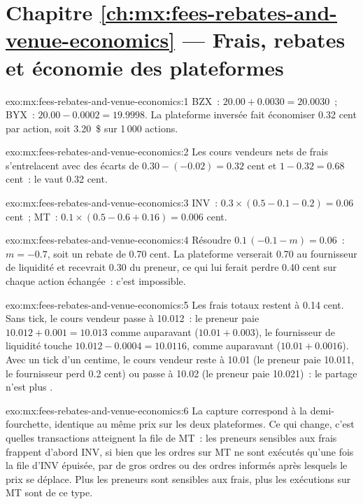 \section*{Chapitre \ref{ch:mx:fees-rebates-and-venue-economics} --- Frais, rebates et économie des plateformes}

\begin{solution}{exo:mx:fees-rebates-and-venue-economics:1}
BZX~: $20.00+0.0030=20.0030$~; BYX~: $20.00-0.0002=19.9998$. La plateforme inversée fait économiser 0.32 cent par action, soit 3.20~\$ sur 1\,000 actions.
\end{solution}

\begin{solution}{exo:mx:fees-rebates-and-venue-economics:2}
Les cours vendeurs nets de frais s'entrelacent avec des écarts de $0.30-(-0.02)=0.32$ cent et $1-0.32=0.68$ cent~: le  vaut 0.32 cent.
\end{solution}

\begin{solution}{exo:mx:fees-rebates-and-venue-economics:3}
INV~: $0.3\times(0.5-0.1-0.2)=0.06$ cent~; MT~: $0.1\times(0.5-0.6+0.16)=0.006$ cent.
\end{solution}

\begin{solution}{exo:mx:fees-rebates-and-venue-economics:4}
Résoudre $0.1\,(-0.1-m)=0.06$~: $m=-0.7$, soit un rebate de 0.70 cent. La plateforme verserait 0.70 au fournisseur de liquidité et recevrait 0.30 du preneur, ce qui lui ferait perdre 0.40 cent sur
chaque action échangée~: c'est impossible.
\end{solution}

\begin{solution}{exo:mx:fees-rebates-and-venue-economics:5}
Les frais totaux restent à 0.14 cent. Sans tick, le cours vendeur passe à 10.012~: le preneur paie $10.012+0.001=10.013$ comme auparavant ($10.01+0.003$), le fournisseur de liquidité touche
$10.012-0.0004=10.0116$, comme auparavant ($10.01+0.0016$). Avec un tick d'un centime, le cours vendeur reste à 10.01 (le preneur paie 10.011, le fournisseur perd 0.2 cent) ou passe à 10.02
(le preneur paie 10.021)~: le partage n'est plus .
\end{solution}

\begin{solution}{exo:mx:fees-rebates-and-venue-economics:6}
La capture correspond à la demi-fourchette, identique au même prix sur les deux plateformes. Ce qui change, c'est quelles transactions atteignent la file de MT~: les preneurs sensibles aux frais frappent d'abord INV,
si bien que les ordres sur MT ne sont exécutés qu'une fois la file d'INV épuisée, par de gros ordres ou des ordres informés après lesquels le prix se déplace. Plus les preneurs sont sensibles aux frais, plus les
exécutions sur MT sont de ce type.
\end{solution}

